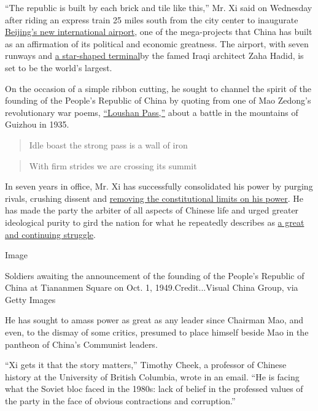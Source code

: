 ``The republic is built by each brick and tile like this,'' Mr. Xi said
on Wednesday after riding an express train 25 miles south from the city
center to inaugurate
\href{https://www.nytimes3xbfgragh.onion/2018/11/24/world/asia/china-beijing-daxing-airport.html}{Beijing's
new international airport}, one of the mega-projects that China has
built as an affirmation of its political and economic greatness. The
airport, with seven runways and
\href{https://www.bbc.co.uk/news/world-asia-china-49750182}{a
star-shaped terminal}by the famed Iraqi architect Zaha Hadid, is set to
be the world's largest.

On the occasion of a simple ribbon cutting, he sought to channel the
spirit of the founding of the People's Republic of China by quoting from
one of Mao Zedong's revolutionary war poems,
\href{https://allpoetry.com/Loushan-Pass}{``Loushan Pass,''} about a
battle in the mountains of Guizhou in 1935.

\begin{quote}
Idle boast the strong pass is a wall of iron
\end{quote}

\begin{quote}
With firm strides we are crossing its summit
\end{quote}

In seven years in office, Mr. Xi has successfully consolidated his power
by purging rivals, crushing dissent and
\href{https://www.nytimes3xbfgragh.onion/2018/03/11/world/asia/china-xi-constitution-term-limits.html?searchResultPosition=1}{removing
the constitutional limits on his power}. He has made the party the
arbiter of all aspects of Chinese life and urged greater ideological
purity to gird the nation for what he repeatedly describes as
\href{https://www.nytimes3xbfgragh.onion/2019/09/07/world/asia/china-hong-kong-xi-jinping.html}{a
great and continuing struggle}.

Image

Soldiers awaiting the announcement of the founding of the People's
Republic of China at Tiananmen Square on Oct. 1, 1949.Credit...Visual
China Group, via Getty Images

He has sought to amass power as great as any leader since Chairman Mao,
and even, to the dismay of some critics, presumed to place himself
beside Mao in the pantheon of China's Communist leaders.

``Xi gets it that the story matters,'' Timothy Cheek, a professor of
Chinese history at the University of British Columbia, wrote in an
email. ``He is facing what the Soviet bloc faced in the 1980s: lack of
belief in the professed values of the party in the face of obvious
contractions and corruption.''

